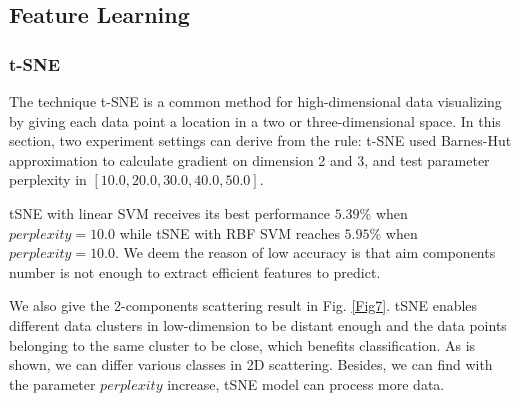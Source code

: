 \documentclass{article}
\begin{document}
\subsection{Feature Learning}
\subsubsection{t-SNE}

The technique t-SNE is a common method for high-dimensional data visualizing by giving each data point a location in a two or three-dimensional space. In this section, two experiment settings can derive from the rule: t-SNE used Barnes-Hut approximation to calculate gradient on dimension 2 and 3, and test parameter perplexity in $[10.0, 20.0, 30.0, 40.0, 50.0]$. 

tSNE with linear SVM receives its best performance $5.39\%$ when $perplexity=10.0$ while tSNE with RBF SVM reaches $5.95\%$ when $perplexity=10.0$. We deem the reason of low accuracy is that aim components number is not enough to extract efficient features to predict.

We also give the 2-components scattering result in Fig. \ref{Fig7}. tSNE enables different data clusters in low-dimension to be distant enough and the data points belonging to the same cluster to be close, which benefits classification. As is shown, we can differ various classes in 2D scattering. Besides, we can find with the parameter $perplexity$ increase, tSNE model can process more data.
\end{document}

